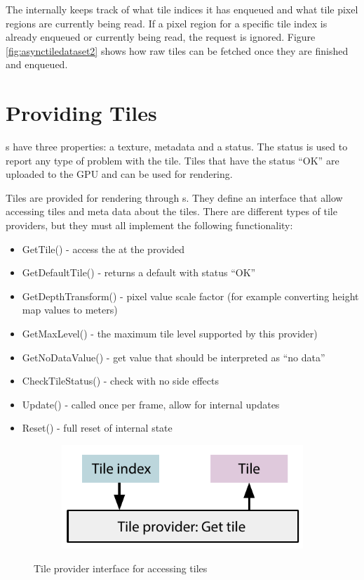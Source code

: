 The  internally keeps track of what tile indices it has enqueued and what tile pixel regions are currently being read. If a pixel region for a specific tile index is already enqueued or currently being read, the request is ignored. Figure \ref{fig:asynctiledataset2} shows how raw tiles can be fetched once they are finished and enqueued.


\section{Providing Tiles}
s have three properties: a texture, metadata and a status. The status is used to report any type of problem with the tile. Tiles that have the status ``OK'' are uploaded to the GPU and can be used for rendering. 

Tiles are provided for rendering through s. They define an interface that allow accessing tiles and meta data about the tiles. There are different types of tile providers, but they must all implement the following functionality:

\begin{itemize}
\item GetTile() - access the  at the provided 
\item GetDefaultTile() - returns a default  with status ``OK''
\item GetDepthTransform() - pixel value scale factor (for example converting height map values to meters)
\item GetMaxLevel() - the maximum tile level supported by this provider)
\item GetNoDataValue() - get value that should be interpreted as ``no data''
\item CheckTileStatus() - check  with no side effects
\item Update() - called once per frame, allow for internal updates
\item Reset() - full reset of internal state
\end{itemize}

\begin{figure}[htbp]
    \centering
    \begin{subfigure}[bt]{0.4\textwidth}
        \includegraphics[width=\textwidth]{figures/implementation/tileprovider/tileprovider_gettile.pdf}
    \end{subfigure}
    \caption{Tile provider interface for accessing tiles}
    \label{fig:tileprovider}
\end{figure}

